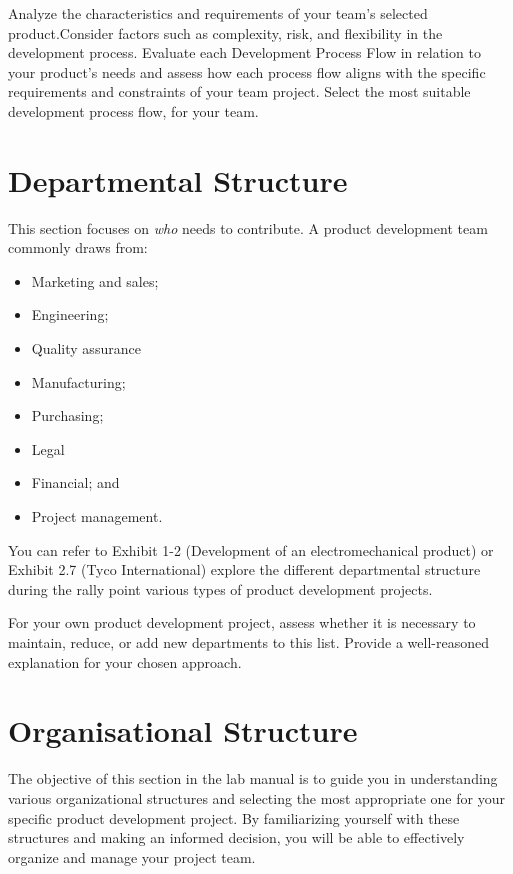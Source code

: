 Analyze the characteristics and requirements of your team's selected product.Consider factors such as complexity, risk, and flexibility in the development process. Evaluate each Development Process Flow in relation to your product's needs and assess how each process flow aligns with the specific requirements and constraints of your team project.  Select the most suitable development process flow, for your team.



\section{Departmental Structure}

This section focuses on \emph{who} needs to contribute. A product development team commonly draws from:
\begin{itemize}
    \item Marketing and sales;
    \item Engineering;
    \item Quality assurance
    \item Manufacturing;
    \item Purchasing;
    \item Legal
    \item Financial; and
    \item Project management.
\end{itemize}

You can refer to Exhibit 1-2 (Development of an electromechanical product) or Exhibit 2.7 (Tyco International) explore the different departmental structure during the rally point various types of product development projects.


For your own product development project, assess whether it is necessary to maintain, reduce, or add new departments to this list. Provide a well-reasoned explanation for your chosen approach.




\section{Organisational Structure}

The objective of this section in the lab manual is to guide you in understanding various organizational structures and selecting the most appropriate one for your specific product development project. By familiarizing yourself with these structures and making an informed decision, you will be able to effectively organize and manage your project team.

